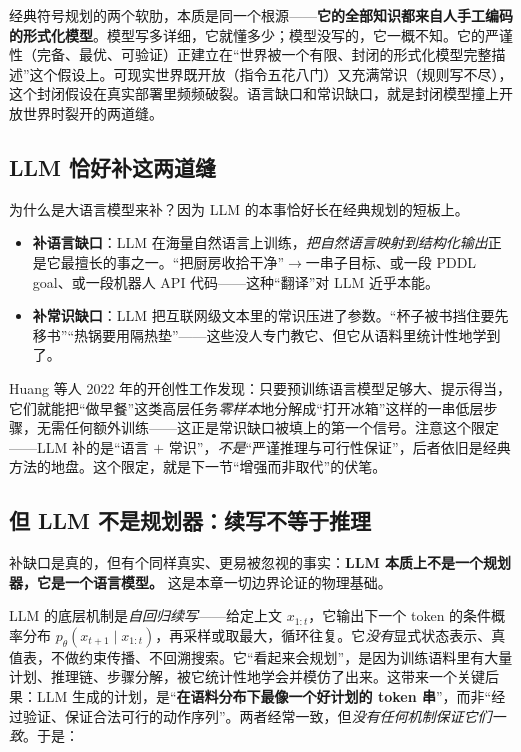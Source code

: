 \begin{insight}
经典符号规划的两个软肋，本质是同一个根源——\textbf{它的全部知识都来自人手工编码的形式化模型}。模型写多详细，它就懂多少；模型没写的，它一概不知。它的严谨性（完备、最优、可验证）正建立在“世界被一个有限、封闭的形式化模型完整描述”这个假设上。可现实世界既开放（指令五花八门）又充满常识（规则写不尽），这个封闭假设在真实部署里频频破裂。语言缺口和常识缺口，就是封闭模型撞上开放世界时裂开的两道缝。
\end{insight}

\subsection{LLM 恰好补这两道缝}
\label{sec:llm-fill}

为什么是大语言模型来补？因为 LLM 的本事恰好长在经典规划的短板上。

\begin{itemize}
  \item \textbf{补语言缺口}：LLM 在海量自然语言上训练，\emph{把自然语言映射到结构化输出}正是它最擅长的事之一。“把厨房收拾干净”$\to$一串子目标、或一段 PDDL goal、或一段机器人 API 代码——这种“翻译”对 LLM 近乎本能。
  \item \textbf{补常识缺口}：LLM 把互联网级文本里的常识压进了参数。“杯子被书挡住要先移书”“热锅要用隔热垫”——这些没人专门教它、但它从语料里统计性地学到了。
\end{itemize}

\noindent Huang 等人 2022 年的开创性工作发现：只要预训练语言模型足够大、提示得当，它们就能把“做早餐”这类高层任务\emph{零样本}地分解成“打开冰箱”这样的一串低层步骤，无需任何额外训练\cite{huang2022zeroshot}——这正是常识缺口被填上的第一个信号。注意这个限定——LLM 补的是“语言 $+$ 常识”，\emph{不是}“严谨推理与可行性保证”，后者依旧是经典方法的地盘。这个限定，就是下一节“增强而非取代”的伏笔。

\subsection{但 LLM 不是规划器：续写不等于推理}
\label{sec:llm-not-planner}

补缺口是真的，但有个同样真实、更易被忽视的事实：\textbf{LLM 本质上不是一个规划器，它是一个语言模型。} 这是本章一切边界论证的物理基础。

LLM 的底层机制是\emph{自回归续写}——给定上文 $x_{1:t}$，它输出下一个 token 的条件概率分布 $p_\theta(x_{t+1}\mid x_{1:t})$，再采样或取最大，循环往复。它\emph{没有}显式状态表示、真值表，不做约束传播、不回溯搜索。它“看起来会规划”，是因为训练语料里有大量计划、推理链、步骤分解，被它统计性地学会并模仿了出来。这带来一个关键后果：LLM 生成的计划，是“\textbf{在语料分布下最像一个好计划的 token 串}”，而非“经过验证、保证合法可行的动作序列”。两者经常一致，但\emph{没有任何机制保证它们一致}。于是：

